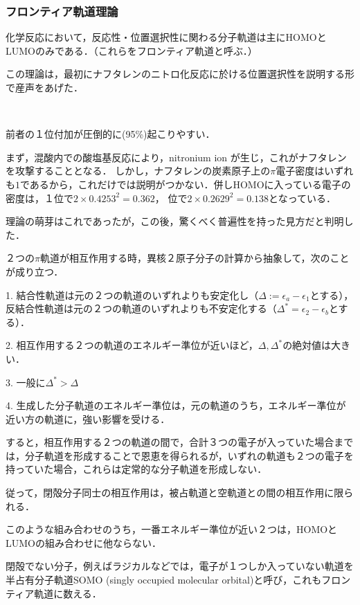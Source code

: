 \documentclass[uplatex, dvipdfmx]{jsreport}
\begin{document}
\subsubsection{フロンティア軌道理論}

\begin{definition}[福井謙一(52)]
    化学反応において，反応性・位置選択性に関わる分子軌道は主にHOMOとLUMOのみである．（これらをフロンティア軌道と呼ぶ．）

    この理論は，最初にナフタレンのニトロ化反応に於ける位置選択性を説明する形で産声をあげた．
\end{definition}
\begin{example}[naphthaleneのnitration]　

    \ce{+}

    前者の１位付加が圧倒的に(95\%)起こりやすい．

    まず，混酸内での酸塩基反応により，nitronium ion が生じ，これがナフタレンを攻撃することとなる．
    しかし，ナフタレンの炭素原子上の$\pi$電子密度はいずれも$1$であるから，これだけでは説明がつかない．併しHOMOに入っている電子の密度は，１位で$2\times 0.4253^2=0.362$，
    位で$2\times 0.2629^2=0.138$となっている．
    
    理論の萌芽はこれであったが，この後，驚くべく普遍性を持った見方だと判明した．
\end{example}

\begin{theory}
    ２つの$\pi$軌道が相互作用する時，異核２原子分子の計算から抽象して，次のことが成り立つ．

    1. 結合性軌道は元の２つの軌道のいずれよりも安定化し（$\Delta:=\epsilon_a-\epsilon_1$とする），反結合性軌道は元の２つの軌道のいずれよりも不安定化する（$\Delta^*=\epsilon_2-\epsilon_b$とする）．

    2. 相互作用する２つの軌道のエネルギー準位が近いほど，$\Delta,\Delta^*$の絶対値は大きい．

    3. 一般に$\Delta^*>\Delta$

    4. 生成した分子軌道のエネルギー準位は，元の軌道のうち，エネルギー準位が近い方の軌道に，強い影響を受ける．

    すると，相互作用する２つの軌道の間で，合計３つの電子が入っていた場合までは，分子軌道を形成することで恩恵を得られるが，いずれの軌道も２つの電子を持っていた場合，これらは定常的な分子軌道を形成しない．

    従って，閉殻分子同士の相互作用は，被占軌道と空軌道との間の相互作用に限られる．

    このような組み合わせのうち，一番エネルギー準位が近い２つは，HOMOとLUMOの組み合わせに他ならない．
\end{theory}
\begin{remark}
    閉殻でない分子，例えばラジカルなどでは，電子が１つしか入っていない軌道を半占有分子軌道SOMO (singly occupied molecular orbital)と呼び，これもフロンティア軌道に数える．
\end{remark}
\end{document}
